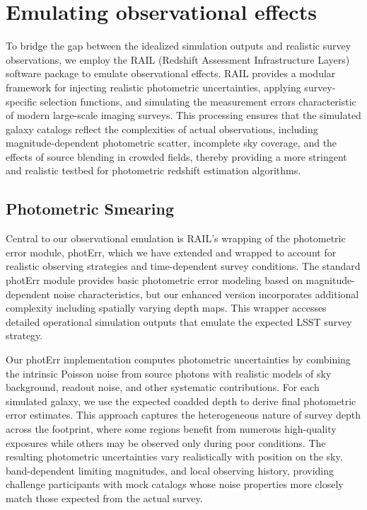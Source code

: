 \section{Emulating observational effects}
\label{sec:emulating_observations}

To bridge the gap between the idealized simulation outputs and
realistic survey observations, we employ the RAIL (Redshift Assessment
Infrastructure Layers) software package to emulate observational
effects. RAIL provides a modular framework for injecting realistic
photometric uncertainties, applying survey-specific selection
functions, and simulating the measurement errors characteristic of
modern large-scale imaging surveys. This processing ensures that the
simulated galaxy catalogs reflect the complexities of actual
observations, including magnitude-dependent photometric scatter,
incomplete sky coverage, and the effects of source blending in crowded
fields, thereby providing a more stringent and realistic testbed for
photometric redshift estimation algorithms.


\subsection{Photometric Smearing}

Central to our observational emulation is RAIL's wrapping of the
photometric error module, photErr, which we have extended and wrapped
to account for realistic observing strategies and time-dependent
survey conditions. The standard photErr module provides basic
photometric error modeling based on magnitude-dependent noise
characteristics, but our enhanced version incorporates additional
complexity including spatially varying depth maps. This
wrapper accesses detailed operational simulation outputs that emulate
the expected LSST survey strategy.

Our photErr implementation computes photometric uncertainties by
combining the intrinsic Poisson noise from source photons with
realistic models of sky background, readout noise, and other
systematic contributions. For each simulated galaxy, we use the expected
coadded depth to derive final photometric error estimates. This
approach captures the heterogeneous nature of survey depth across the
footprint, where some regions benefit from numerous high-quality
exposures while others may be observed only during poor
conditions. The resulting photometric uncertainties vary realistically
with position on the sky, band-dependent limiting magnitudes, and
local observing history, providing challenge participants with mock
catalogs whose noise properties more closely match those expected from
the actual survey.


